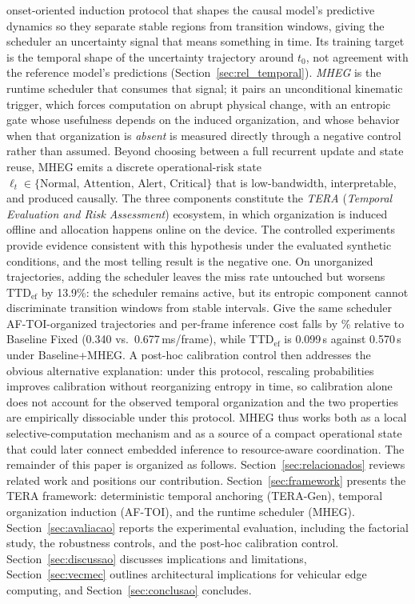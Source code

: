 \documentclass[a4paper,fleqn]{cas-dc}
\begin{document}
onset-oriented induction protocol that shapes the causal model's predictive
dynamics so they separate stable regions from transition windows, giving the
scheduler an uncertainty signal that means something in time.
{\color{\revcolor}Its training target is the temporal shape of the uncertainty
trajectory around $t_0$, not agreement with the reference model's
predictions (Section~\ref{sec:rel_temporal}).} \textit{MHEG} is
the runtime scheduler that consumes that signal; it pairs an unconditional
kinematic trigger, which forces computation on abrupt physical change, with an
entropic gate whose usefulness depends on the induced organization, and whose
behavior when that organization is \emph{absent} is measured directly through a
negative control rather than assumed. Beyond choosing between a full recurrent
update and state reuse, \mbox{MHEG} emits a discrete operational-risk state
$\ell_t \in \{\text{Normal},\, \text{Attention},\, \text{Alert},\, \text{Critical}\}$
that is low-bandwidth, interpretable, and produced causally. The three components
constitute the \textit{TERA} (\textit{Temporal Evaluation and Risk Assessment})
ecosystem, in which organization is induced offline and allocation happens online
on the device.
The controlled experiments provide evidence consistent with this hypothesis
under the evaluated synthetic conditions, and the most telling result is the
negative one. On unorganized trajectories, adding the scheduler leaves the miss
rate untouched but worsens $\mathrm{TTD}_{\mathrm{ef}}$ by
{\color{\revcolor}13.9\%}: the scheduler
{\color{\revcolor}remains active, but its entropic component cannot
discriminate transition windows from stable intervals.}
{\color{\revcolor}Give the same scheduler \mbox{AF-TOI}-organized trajectories
and per-frame inference cost falls by \CostReduction\% relative to Baseline
Fixed (0.340 vs.\ 0.677\,ms/frame), while $\mathrm{TTD}_{\mathrm{ef}}$ is
0.099\,s against 0.570\,s under Baseline+MHEG}.
A post-hoc calibration control then addresses the obvious alternative
explanation: under this protocol, rescaling probabilities improves calibration
without reorganizing entropy in time, so calibration alone does not account
for the observed temporal organization and the two properties are empirically
dissociable under this protocol. \mbox{MHEG} thus works both as a
local selective-computation mechanism and as a source of a compact operational
state that could later connect embedded inference to resource-aware coordination.
{\color{\revcolor}The remainder of this paper is organized as follows.
Section~\ref{sec:relacionados} reviews related work and positions our
contribution. Section~\ref{sec:framework} presents the TERA framework:
deterministic temporal anchoring (\mbox{TERA-Gen}), temporal organization
induction (\mbox{AF-TOI}), and the runtime scheduler (\mbox{MHEG}).
Section~\ref{sec:avaliacao} reports the experimental evaluation, including the
factorial study, the robustness controls, and the post-hoc calibration control.
Section~\ref{sec:discussao} discusses implications and limitations,
Section~\ref{sec:vecmec} outlines architectural implications for vehicular
edge computing, and Section~\ref{sec:conclusao} concludes.}
\end{document}
